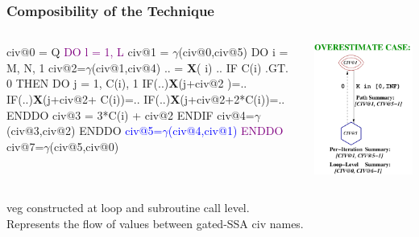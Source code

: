 \documentclass{beamer}
\newcommand{\blue}[1]{\textcolor{Blue}{{#1}}}
\newcommand{\purple}[1]{\textcolor{Purple}{{#1}}}
\newcommand{\emp}[1]{\textcolor{DikuRed}{ #1}}
\newcommand{\mymath}[1]{$ #1 $}
\begin{document}
\begin{frame}[fragile,t]
\frametitle{Composibility of the Technique}
\vspace{-2ex}
\begin{columns}
\begin{colorcode}[fontsize=\small]
civ@0 = Q
\purple{DO l = 1, L}
 \emp{civ@1 = \mymath{\gamma}(civ@0,civ@5)}
 DO i = M, N, 1
  civ@2=\mymath{\gamma}(civ@1,civ@4)
  .. = {\bf X}(\emp{i}) ..
  IF C(i) .GT. 0 THEN
   DO j = 1, C(i), 1
    IF(..){\bf{}X}(j+civ@2       )=..
    IF(..){\bf{}X}(j+civ@2+  C(i))=..
    IF(..){\bf{}X}(j+civ@2+2*C(i))=..
   ENDDO
   civ@3 = 3*C(i) + civ@2
  ENDIF
  civ@4=\mymath{\gamma}(civ@3,civ@2)
 ENDDO
 \blue{civ@5=\mymath{\gamma}(civ@4,civ@1)}
\purple{ENDDO}
civ@7=\mymath{\gamma}(civ@5,civ@0)
\end{colorcode}
\includegraphics[height=44ex]{Figures/VEG_CORRECcomp.pdf}
\end{columns}
\bigskip

{\sc veg} constructed at loop and subroutine call level.\\ 
Represents the flow of values between gated-SSA {\sc civ} names. 

\end{frame}
\end{document}

